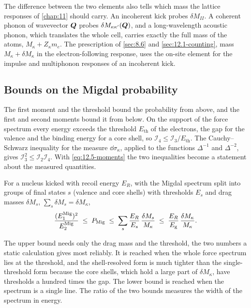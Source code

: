 The difference between the two elements also tells which mass the lattice responses of \cref{chap:11} should carry. An incoherent kick probes $\delta M_{II}$. A coherent phonon of wavevector $\bm{Q}$ probes $\delta M_{\kappa\kappa'}(\bm{Q})$, and a long-wavelength acoustic phonon, which translates the whole cell, carries exactly the full mass of the atoms, $M_\kappa + Z_\kappa m_e$. The prescription of \cref{sec:8.6} and \cref{sec:12.1-counting}, mass $M_\kappa + \delta M_\kappa$ in the electron-following response, uses the on-site element for the impulse and multiphonon responses of an incoherent kick.

\subsection{Bounds on the Migdal probability}\label{sec:12.5-bounds}

The first moment and the threshold bound the probability from above, and the first and second moments bound it from below. On the support of the force spectrum every energy exceeds the threshold $E_{\mathrm{th}}$ of the electrons, the gap for the valence and the binding energy for a core shell, so $\mathcal{I}_4 \le \mathcal{I}_3/E_{\mathrm{th}}$. The Cauchy--Schwarz inequality for the measure $\dd\sigma_\kappa$, applied to the functions $\Delta^{-1}$ and $\Delta^{-2}$, gives $\mathcal{I}_3^2 \le \mathcal{I}_2\mathcal{I}_4$. With \cref{eq:12.5-moments} the two inequalities become a statement about the measured quantities.
\begin{keyresult}
For a nucleus kicked with recoil energy $E_R$, with the Migdal spectrum split into groups of final states $s$ (valence and core shells) with thresholds $E_s$ and drag masses $\delta M_s$, $\sum_s\delta M_s = \delta M_\kappa$,
\begin{equation}
  \frac{(E^{\mathrm{Mig}}_1)^2}{E^{\mathrm{Mig}}_2} \;\le\; P_{\mathrm{Mig}} \;\le\; \sum_s\frac{E_R}{E_s}\,\frac{\delta M_s}{M_\kappa} \;\le\; \frac{E_R}{E_{\mathrm{g}}}\,\frac{\delta M_\kappa}{M_\kappa} .
  \label{eq:12.5-bound}
\end{equation}
\end{keyresult}
\noindent The upper bound needs only the drag mass and the threshold, the two numbers a static calculation gives most reliably. It is reached when the whole force spectrum lies at the threshold, and the shell-resolved form is much tighter than the single-threshold form because the core shells, which hold a large part of $\delta M_\kappa$, have thresholds a hundred times the gap. The lower bound is reached when the spectrum is a single line. The ratio of the two bounds measures the width of the spectrum in energy.

